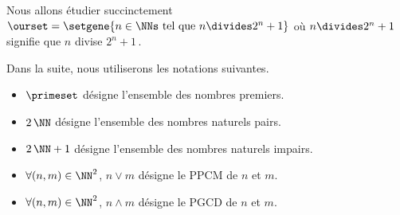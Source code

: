 Nous allons étudier succinctement
$\ourset = \setgene{n \in \NNs \text{ tel que } n \divides 2^n + 1}$
où $n \divides 2^n + 1$ signifie que $n$ divise $2^n + 1$\,.

\medskip

Dans la suite, nous utiliserons les notations suivantes.
\begin{itemize}
	\item $\primeset$ désigne l'ensemble des nombres premiers.
	
	\item $2\,\NN$ désigne l'ensemble des nombres naturels pairs.
	
	\item $2\,\NN + 1$ désigne l'ensemble des nombres naturels impairs.
	
	\item $\forall (n , m) \in \NN^2$, $n \vee m$ désigne le PPCM de $n$ et $m$.

	\item $\forall (n , m) \in \NN^2$, $n \wedge m$ désigne le PGCD de $n$ et $m$.
\end{itemize}